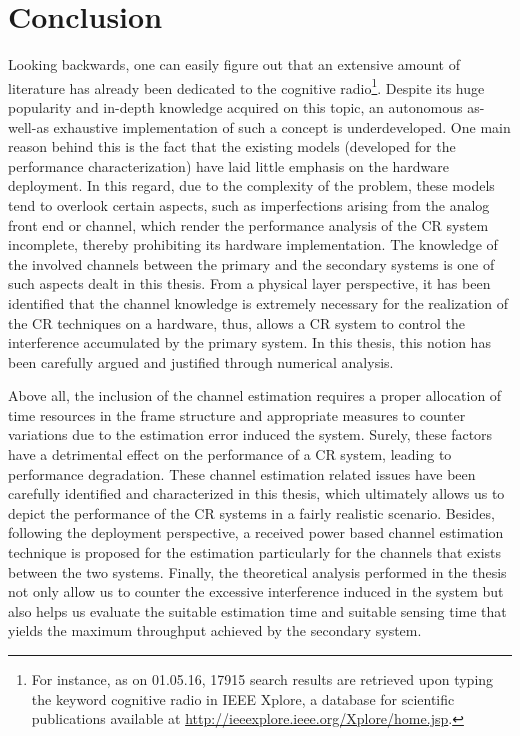 \chapter{Conclusion}
\label{chap:Con}

Looking backwards, one can easily figure out that an extensive amount of literature has already been dedicated to the cognitive radio\footnote{For instance, as on 01.05.16, 17915 search results are retrieved upon typing the keyword cognitive radio in IEEE Xplore, a database for scientific publications available at \url{http://ieeexplore.ieee.org/Xplore/home.jsp}.}. Despite its huge popularity and in-depth knowledge acquired on this topic, an autonomous as-well-as exhaustive implementation of such a concept is underdeveloped. One main reason behind this is the fact that the existing models (developed for the performance characterization) have laid little emphasis on the hardware deployment. In this regard, due to the complexity of the problem, these models tend to overlook certain aspects, such as imperfections arising from the analog front end or channel, which render the performance analysis of the CR system incomplete, thereby prohibiting its hardware implementation. The knowledge of the involved channels between the primary and the secondary systems is one of such aspects dealt in this thesis. 
From a physical layer perspective, it has been identified that the channel knowledge is extremely necessary for the realization of the CR techniques on a hardware, thus, allows a CR system to control the interference accumulated by the primary system. In this thesis, this notion has been carefully argued and justified through numerical analysis. %

Above all, the inclusion of the channel estimation requires a proper allocation of time resources in the frame structure and appropriate measures to counter variations due to the estimation error induced the system. Surely, these factors have a detrimental effect on the performance of a CR system, leading to performance degradation. These channel estimation related issues have been carefully identified and characterized in this thesis, which ultimately allows us to depict the performance of the CR systems in a fairly realistic scenario. Besides, following the deployment perspective, a received power based channel estimation technique is proposed for the estimation particularly for the channels that exists between the two systems. Finally, the theoretical analysis performed in the thesis not only allow us to counter the excessive interference induced in the system but also helps us evaluate the suitable estimation time and suitable sensing time that yields the maximum throughput achieved by the secondary system. 


